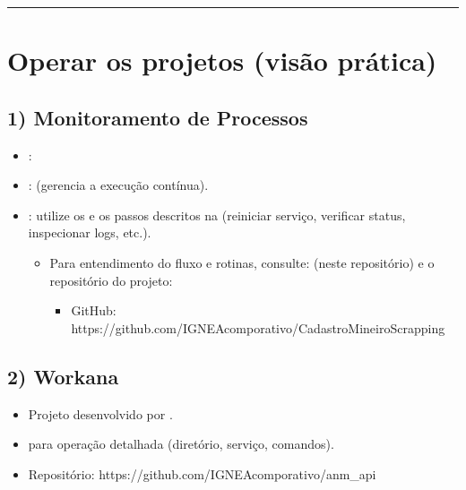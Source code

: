 \documentclass[letterpaper,10pt,brazil]{sphinxmanual}
\begin{document}
\bigskip\hrule\bigskip



\section{Operar os projetos (visão prática)}
\label{\detokenize{sistemas/contabo:operar-os-projetos-visao-pratica}}

\subsection{1) Monitoramento de Processos}
\label{\detokenize{sistemas/contabo:monitoramento-de-processos}}\begin{itemize}
\item {} 
\sphinxAtStartPar
{}: 

\item {} 
\sphinxAtStartPar
{}:  (gerencia a execução contínua).

\item {} 
\sphinxAtStartPar
{}: utilize os  e os passos descritos na (reiniciar serviço, verificar status, inspecionar logs, etc.).
\begin{itemize}
\item {} 
\sphinxAtStartPar
Para entendimento do fluxo e rotinas, consulte:  (neste repositório) e o repositório do projeto:
\begin{itemize}
\item {} 
\sphinxAtStartPar
GitHub: https://github.com/IGNEA\sphinxhyphen{}comporativo/CadastroMineiroScrapping

\end{itemize}

\end{itemize}

\end{itemize}


\subsection{2) Workana}
\label{\detokenize{sistemas/contabo:workana}}\begin{itemize}
\item {} 
\sphinxAtStartPar
Projeto desenvolvido por .

\item {} 
\sphinxAtStartPar
{} para operação detalhada (diretório, serviço, comandos).

\item {} 
\sphinxAtStartPar
Repositório: https://github.com/IGNEA\sphinxhyphen{}comporativo/anm\_api

\end{itemize}
\end{document}
